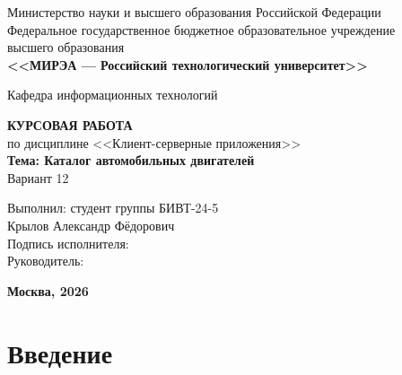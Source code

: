 \documentclass[14pt,a4paper]{extarticle}
\begin{document}
\thispagestyle{titlepage}
\setcounter{page}{1}

\begin{center}
  Министерство науки и высшего образования Российской Федерации\\[4pt]
  Федеральное государственное бюджетное образовательное учреждение\\
  высшего образования\\[4pt]
  \textbf{<<МИРЭА --- Российский технологический университет>>}
\end{center}

\vspace{1cm}
\begin{center}
  Кафедра информационных технологий
\end{center}

\vspace{3cm}
\begin{center}
  \textbf{\large КУРСОВАЯ РАБОТА}\\[6pt]
  по дисциплине <<Клиент-серверные приложения>>\\[12pt]
  \textbf{Тема: Каталог автомобильных двигателей}\\[6pt]
  Вариант 12
\end{center}

\vspace{3cm}
\begin{flushright}
  Выполнил: студент группы БИВТ-24-5\\
  Крылов Александр Фёдорович\\[24pt]
  Подпись исполнителя: \underline{\hspace{4cm}}\\[12pt]
  Руководитель:\\
  \underline{\hspace{6cm}}
\end{flushright}

\vfill
\begin{center}
  \textbf{Москва, 2026}
\end{center}

\newpage

\tableofcontents

\newpage

\section{Введение}
\end{document}
